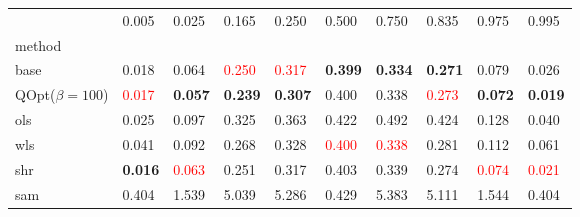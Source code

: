 \begin{tabular}{llllllllll}
\toprule
 & 0.005 & 0.025 & 0.165 & 0.250 & 0.500 & 0.750 & 0.835 & 0.975 & 0.995 \\
method &  &  &  &  &  &  &  &  &  \\
\midrule
base & 0.018 & 0.064 & \textcolor{red}{0.250} & \textcolor{red}{0.317} & \textbf{0.399} & \textbf{0.334} & \textbf{0.271} & 0.079 & 0.026 \\
\midrule
QOpt($\beta=100$) & \textcolor{red}{0.017} & \textbf{0.057} & \textbf{0.239} & \textbf{0.307} & 0.400 & 0.338 & \textcolor{red}{0.273} & \textbf{0.072} & \textbf{0.019} \\
ols & 0.025 & 0.097 & 0.325 & 0.363 & 0.422 & 0.492 & 0.424 & 0.128 & 0.040 \\
wls & 0.041 & 0.092 & 0.268 & 0.328 & \textcolor{red}{0.400} & \textcolor{red}{0.338} & 0.281 & 0.112 & 0.061 \\
shr & \textbf{0.016} & \textcolor{red}{0.063} & 0.251 & 0.317 & 0.403 & 0.339 & 0.274 & \textcolor{red}{0.074} & \textcolor{red}{0.021} \\
sam & 0.404 & 1.539 & 5.039 & 5.286 & 0.429 & 5.383 & 5.111 & 1.544 & 0.404 \\
\bottomrule
\end{tabular}